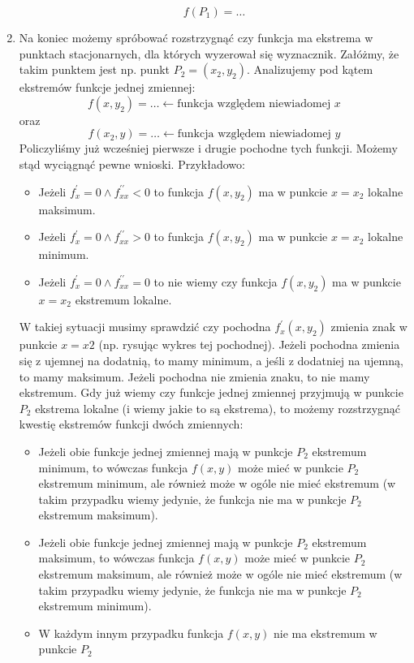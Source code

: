 \begin{enumerate}
    \[
        f(P_1)= \dots
    \]
    \item Na koniec możemy spróbować rozstrzygnąć czy funkcja ma ekstrema w punktach stacjonarnych,
    dla których wyzerował się wyznacznik.
    Załóżmy, że takim punktem jest np. punkt $P_2=(x_2,y_2)$.
    Analizujemy pod kątem ekstremów funkcje jednej zmiennej:
    \[
        f(x,y_2)= \dots \leftarrow \text{funkcja względem niewiadomej $x$}
    \]
    oraz
    \[
        f(x_2,y)= \dots \leftarrow \text{funkcja względem niewiadomej $y$}
    \]
    Policzyliśmy już wcześniej pierwsze i drugie pochodne tych funkcji.
    Możemy stąd wyciągnąć pewne wnioski. Przykładowo:
    \begin{itemize}[itemsep=0pt,partopsep=0pt, parsep=0pt]
        \item Jeżeli $f^{\prime}_x=0 \land f^{\prime\prime}_{xx}<0$ to funkcja $f(x,y_2)$ ma w punkcie $x=x_2$ lokalne maksimum.
        \item Jeżeli $f^{\prime}_x=0 \land f^{\prime\prime}_{xx}>0$ to funkcja $f(x,y_2)$ ma w punkcie $x=x_2$ lokalne minimum.
        \item Jeżeli $f^{\prime}_x=0 \land f^{\prime\prime}_{xx}=0$ to nie wiemy czy funkcja $f(x,y_2)$
        ma w punkcie $x=x_2$ ekstremum lokalne.
    \end{itemize}
    W takiej sytuacji musimy sprawdzić czy pochodna $f^{\prime}_x(x,y_2)$ zmienia znak w punkcie $x=x2$
    (np. rysując wykres tej pochodnej).
    Jeżeli pochodna zmienia się z ujemnej na dodatnią, to mamy minimum, a jeśli z dodatniej na ujemną, to mamy maksimum.
    Jeżeli pochodna nie zmienia znaku, to nie mamy ekstremum.
    Gdy już wiemy czy funkcje jednej zmiennej przyjmują w punkcie $P_2$ ekstrema lokalne (i wiemy jakie to są ekstrema),
    to możemy rozstrzygnąć kwestię ekstremów funkcji dwóch zmiennych:
    \begin{itemize}[itemsep=0pt,partopsep=0pt, parsep=0pt]
        \item Jeżeli obie funkcje jednej zmiennej mają w punkcje $P_2$ ekstremum minimum, to wówczas funkcja $f(x,y)$
        może mieć w punkcie $P_2$ ekstremum minimum, ale również może w ogóle nie mieć ekstremum
        (w takim przypadku wiemy jedynie, że funkcja nie ma w punkcje $P_2$ ekstremum maksimum).
        \item Jeżeli obie funkcje jednej zmiennej mają w punkcje $P_2$ ekstremum maksimum, to wówczas funkcja $f(x,y)$
        może mieć w punkcie $P_2$ ekstremum maksimum, ale również może w ogóle nie mieć ekstremum
        (w takim przypadku wiemy jedynie, że funkcja nie ma w punkcje $P_2$ ekstremum minimum).
        \item W każdym innym przypadku funkcja $f(x,y)$ nie ma ekstremum w punkcie $P_2$
    \end{itemize}
\end{enumerate}
